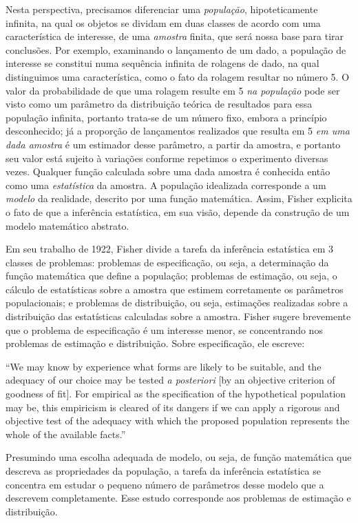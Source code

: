 \documentclass[12pt,a4paper]{article}
\begin{document}
Nesta perspectiva, precisamos diferenciar uma {\em população}, hipoteticamente infinita, na qual os objetos se dividam em duas
classes de acordo com uma característica de interesse, de uma {\em amostra} finita, que será nossa base para tirar conclusões.
Por exemplo, examinando o lançamento de um dado, a população de interesse se constitui numa sequência infinita de rolagens
de dado, na qual distinguimos uma característica, como o fato da rolagem resultar no número 5. O valor da probabilidade de que
uma rolagem resulte em 5 {\em na população} pode ser visto como um parâmetro da distribuição teórica de resultados para essa
população infinita, portanto trata-se de um número fixo, embora a princípio desconhecido; 
já a proporção de lançamentos realizados que resulta em 5 {\em em uma dada amostra} é um estimador desse parâmetro,
a partir da amostra, e portanto seu valor está sujeito à variações conforme repetimos o experimento diversas vezes.
Qualquer função calculada sobre uma dada amostra é conhecida então como uma {\em estatística} da amostra.
A população idealizada corresponde a um {\em modelo} da realidade, descrito por uma função matemática.
Assim, Fisher explicita o fato de que a inferência estatística, em sua visão, depende da construção de um modelo matemático
abstrato.

Em seu trabalho de 1922, Fisher divide a tarefa da inferência estatística em 3 classes de 
problemas: problemas de especificação, ou seja, a determinação da função
matemática que define a população; problemas de estimação, ou seja, o cálculo de estatísticas sobre a amostra que estimem 
corretamente os parâmetros populacionais; e problemas de distribuição, ou seja, estimações realizadas sobre a distribuição
das estatísticas calculadas sobre a amostra. Fisher sugere brevemente que o problema de especificação é um interesse menor,
se concentrando nos problemas de estimação e distribuição. Sobre especificação, ele escreve:

``We may know by experience what forms are likely to be suitable, and the adequacy of our choice may be
tested {\em a posteriori} [by an objective criterion of goodness of fit].
For empirical as the specification of the hypothetical population may be, this empiricism is cleared of its dangers if
we can apply a rigorous and objective test of the adequacy with which the proposed population represents the whole of
the available facts.''\cite{Fisher1922}

Presumindo uma escolha adequada de modelo, ou seja,	de função matemática que descreva as propriedades da população,
a tarefa da inferência estatística se concentra em estudar o pequeno número de parâmetros desse modelo que a descrevem
completamente. Esse estudo corresponde aos problemas de estimação e distribuição.
\end{document}

